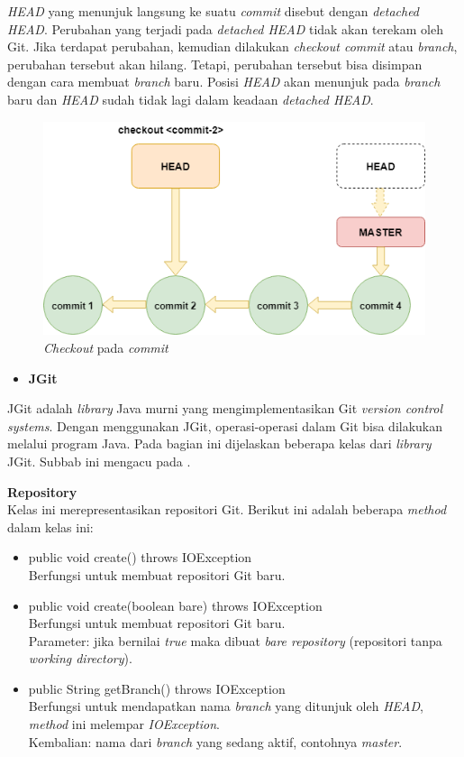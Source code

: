 \documentclass[a4paper,twoside]{article}
\begin{document}
\begin{enumerate}
\textit{HEAD} yang menunjuk langsung ke suatu \textit{commit} disebut dengan \textit{detached HEAD}. Perubahan yang terjadi pada \textit{detached HEAD} tidak akan terekam oleh Git. Jika terdapat perubahan, kemudian dilakukan \textit{checkout commit} atau \textit{branch}, perubahan tersebut akan hilang. Tetapi, perubahan tersebut bisa disimpan dengan cara membuat \textit{branch} baru. Posisi \textit{HEAD} akan menunjuk pada \textit{branch} baru dan \textit{HEAD} sudah tidak lagi dalam keadaan \textit{detached HEAD}. 
\begin{figure}[H]
	\centering
		\includegraphics[scale=0.6]{Gambar/gitcheckoutcommit.png}
	\caption{\textit{Checkout} pada \textit{commit}}
	\label{fig:git_checkout}
\end{figure}

\begin{itemize}
\item \textbf{JGit}\\
\end{itemize}
JGit adalah \textit{library} Java murni yang mengimplementasikan Git \textit{version control systems}\cite{JGit}. Dengan menggunakan JGit, operasi-operasi dalam Git bisa dilakukan melalui program Java. Pada bagian ini dijelaskan beberapa kelas dari \textit{library} JGit. Subbab ini mengacu pada \cite{JGit_java_doc}. 

\textbf{Repository}\\
Kelas ini merepresentasikan repositori Git. Berikut ini adalah beberapa \textit{method} dalam kelas ini:
\begin{itemize}
\item public void create() throws IOException\\
Berfungsi untuk membuat repositori Git baru.
\item public void create(boolean bare) throws IOException\\
Berfungsi untuk membuat repositori Git baru. \\
Parameter: jika bernilai \textit{true} maka dibuat \textit{bare repository} (repositori tanpa \textit{working directory}). 
\item public String getBranch() throws IOException\\
Berfungsi untuk mendapatkan nama \textit{branch} yang ditunjuk oleh \textit{HEAD}, \textit{method} ini melempar \textit{IOException}.\\ 
Kembalian: nama dari \textit{branch} yang sedang aktif, contohnya \textit{master}.


\end{itemize}
\end{enumerate}
\end{document}
